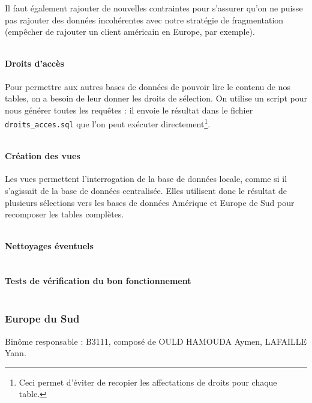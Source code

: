 \documentclass[10pt,a4paper]{article}
\theoremstyle{plain}
\begin{document}
Il faut également rajouter de nouvelles contraintes pour s'assurer qu'on ne puisse pas rajouter des données incohérentes avec notre stratégie de fragmentation (empêcher de rajouter un client américain en Europe, par exemple).

\inputminted{sql}{INSA-DB12-EuropeNord-contraintes.sql}

\newpage

\paragraph{Droits d'accès}

Pour permettre aux autres bases de données de pouvoir lire le contenu de nos tables, on a besoin de leur donner les droits de sélection. On utilise un script pour nous générer toutes les requêtes : il envoie le résultat dans le fichier \verb|droits_acces.sql| que l'on peut exécuter directement\footnote{Ceci permet d'éviter de recopier les affectations de droits pour chaque table.}.
\inputminted{sql}{INSA-DB12-droits-acces.sql}
\newpage

\paragraph{Création des vues}

Les vues permettent l'interrogation de la base de données locale, comme si il s'agissait de la base de données centralisée. Elles utilisent donc le résultat de plusieurs sélections vers les bases de données Amérique et Europe de Sud pour recomposer les tables complètes.

\inputminted{sql}{INSA-DB12-EuropeNord-vues.sql}

\newpage

\paragraph{Nettoyages éventuels}

\inputminted{sql}{INSA-DB12-EuropeNord-drop.sql}

\paragraph{Tests de vérification du bon fonctionnement}

\inputminted{sql}{INSA-DB12-EuropeNord-bon-fonctionnement.sql}
\newpage

\subsubsection{Europe du Sud}
Binôme responsable : B3111, composé de OULD HAMOUDA Aymen, LAFAILLE Yann.\\
\end{document}
